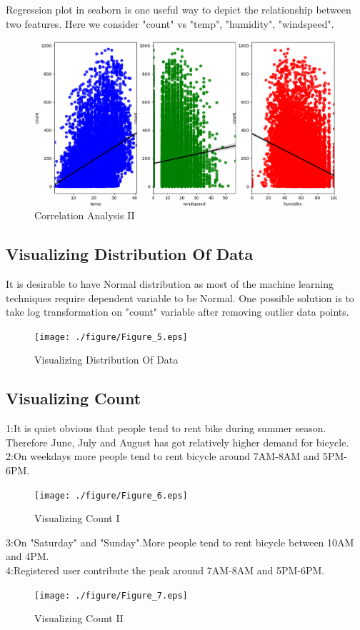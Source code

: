 \documentclass{amsart}
\begin{document}
Regression plot in seaborn is one useful way to depict the relationship between two features. Here we consider "count" vs "temp", "humidity", "windspeed".
\begin{figure}[htbp]
	\includegraphics[scale=0.5]{./figure/Figure_4.eps}
	\caption{Correlation Analysis II}
\end{figure}

\subsection{Visualizing Distribution Of Data}
It is desirable to have Normal distribution as most of the machine learning techniques require dependent variable to be Normal. One possible solution is to take log transformation on "count" variable after removing outlier data points.
\begin{figure}[htbp]
	\texttt{[image: ./figure/Figure\_5.eps]}
	\caption{Visualizing Distribution Of Data}
\end{figure}

\subsection{Visualizing Count}
1:It is quiet obvious that people tend to rent bike during summer season. Therefore June, July and August has got relatively higher demand for bicycle.\\
2:On weekdays more people tend to rent bicycle around 7AM-8AM and 5PM-6PM. 
\begin{figure}[htbp]
	\texttt{[image: ./figure/Figure\_6.eps]}
	\caption{Visualizing Count I}
\end{figure}
3:On "Saturday" and "Sunday".More people tend to rent bicycle between 10AM and 4PM.\\
4:Registered user contribute the peak around 7AM-8AM and 5PM-6PM.
\begin{figure}[htbp]
	\texttt{[image: ./figure/Figure\_7.eps]}
	\caption{Visualizing Count II}
\end{figure}
\end{document}
